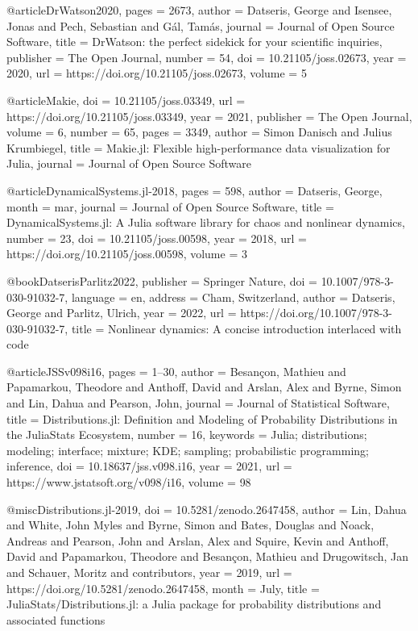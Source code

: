 @article{DrWatson2020,
 pages         = {2673},
 author        = {Datseris, George and Isensee, Jonas and Pech, Sebastian and Gál, Tamás},
 journal       = {Journal of Open Source Software},
 title         = {DrWatson: the perfect sidekick for your scientific inquiries},
 publisher     = {The Open Journal},
 number        = {54},
 doi           = {10.21105/joss.02673},
 year          = {2020},
 url           = {https://doi.org/10.21105/joss.02673},
 volume        = {5}
}

@article{Makie,
  doi = {10.21105/joss.03349},
  url = {https://doi.org/10.21105/joss.03349},
  year = {2021},
  publisher = {The Open Journal},
  volume = {6},
  number = {65},
  pages = {3349},
  author = {Simon Danisch and Julius Krumbiegel},
  title = {{Makie.jl}: Flexible high-performance data visualization for {Julia}},
  journal = {Journal of Open Source Software}
}

@article{DynamicalSystems.jl-2018,
 pages         = {598},
 author        = {Datseris, George},
 month         = {mar},
 journal       = {Journal of Open Source Software},
 title         = {DynamicalSystems.jl: A Julia software library for chaos and nonlinear dynamics},
 number        = {23},
 doi           = {10.21105/joss.00598},
 year          = {2018},
 url           = {https://doi.org/10.21105/joss.00598},
 volume        = {3}
}

@book{DatserisParlitz2022,
 publisher     = {Springer Nature},
 doi           = {10.1007/978-3-030-91032-7},
 language      = {en},
 address       = {Cham, Switzerland},
 author        = {Datseris, George and Parlitz, Ulrich},
 year          = {2022},
 url           = {https://doi.org/10.1007/978-3-030-91032-7},
 title         = {Nonlinear dynamics: A concise introduction interlaced with code}
}

@article{JSSv098i16,
 pages         = {1--30},
 author        = {Besançon, Mathieu and Papamarkou, Theodore and Anthoff, David and Arslan, Alex and Byrne, Simon and Lin, Dahua and Pearson, John},
 journal       = {Journal of Statistical Software},
 title         = {Distributions.jl: Definition and Modeling of Probability Distributions in the JuliaStats Ecosystem},
 number        = {16},
 keywords      = {Julia; distributions; modeling; interface; mixture; KDE; sampling; probabilistic programming; inference},
 doi           = {10.18637/jss.v098.i16},
 year          = {2021},
 url           = {https://www.jstatsoft.org/v098/i16},
 volume        = {98}
}

@misc{Distributions.jl-2019,
 doi           = {10.5281/zenodo.2647458},
 author        = {Lin, Dahua and White, John  Myles and Byrne, Simon and Bates, Douglas and Noack, Andreas and Pearson, John and Arslan, Alex and Squire, Kevin and Anthoff, David and Papamarkou, Theodore and Besançon, Mathieu and Drugowitsch, Jan and Schauer, Moritz and contributors},
 year          = {2019},
 url           = {https://doi.org/10.5281/zenodo.2647458},
 month         = {July},
 title         = {{JuliaStats/Distributions.jl: a Julia package for probability distributions and associated functions}}
}

